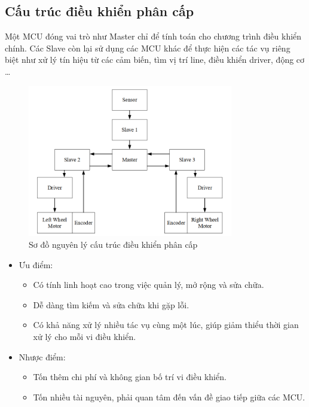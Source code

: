     \subsection{Cấu trúc điều khiển phân cấp}
    \hspace*{0.6cm} Một MCU đóng vai trò như Master chỉ để tính toán cho chương trình điều
    khiển chính. Các Slave còn lại sử dụng các MCU khác để thực hiện các tác vụ riêng biệt
    như xử lý tín hiệu từ các cảm biến, tìm vị trí line, điều khiển driver, động cơ \dots
    \begin{figure}[H]
        \centering
        \includegraphics[width=0.8\textwidth]{pictures/chapter1/chapter1_pic19_phancap.png}
        \caption{Sơ đồ nguyên lý cấu trúc điều khiển phân cấp}
        \label{chap1_pic19}
    \end{figure}
    \begin{itemize}
        \item Ưu điểm: 
        \begin{itemize}[label=\textendash]
            \item Có tính linh hoạt cao trong việc quản lý, mở rộng và sửa chữa.
            \item Dễ dàng tìm kiếm và sửa chữa khi gặp lỗi.
            \item Có khả năng xử lý nhiều tác vụ cùng một lúc, giúp giảm thiểu thời gian xử lý cho mỗi vi điều khiển.
        \end{itemize}
        \item Nhược điểm: 
        \begin{itemize}[label=\textendash]
            \item Tốn thêm chi phí và không gian bố trí vi điều khiển.
            \item Tốn nhiều tài nguyên, phải quan tâm đến vấn đề giao tiếp giữa các MCU.
        \end{itemize}
    \end{itemize}
